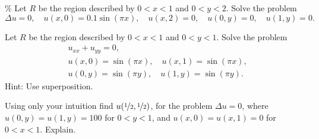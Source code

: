 \documentclass{ximera}
\begin{document}
\begin{exercise}\%
    Let $R$ be the region described by $0 < x < 1$ and $0 < y < 2$. Solve the problem
    \begin{equation*}
        \Delta u = 0, \quad u(x,0) = 0.1 \sin (\pi x), \quad u(x,2) = 0, \quad u(0,y) = 0, \quad u(1,y) = 0 .
    \end{equation*}
\end{exercise}


\begin{exercise}
    Let $R$ be the region described by $0 < x < 1$ and $0 < y < 1$. Solve the problem
    \begin{align*}
        & u_{xx} + u_{yy} = 0, \\
        & u(x,0) = \sin (\pi x), \quad u(x,1) = \sin (\pi x), \\
        & u(0,y) = \sin (\pi y), \quad u(1,y) = \sin (\pi y) .
    \end{align*}
    Hint: Use superposition.
\end{exercise}

\begin{exercise}%
    Using only your intuition find $u(\nicefrac{1}{2},\nicefrac{1}{2})$, for the problem $\Delta u = 0$, where $u(0,y) = u(1,y) = 100$ for $0 < y < 1$, and $u(x,0) = u(x,1) = 0$ for $0 < x < 1$.  Explain.
\end{exercise}





%
\end{document}
